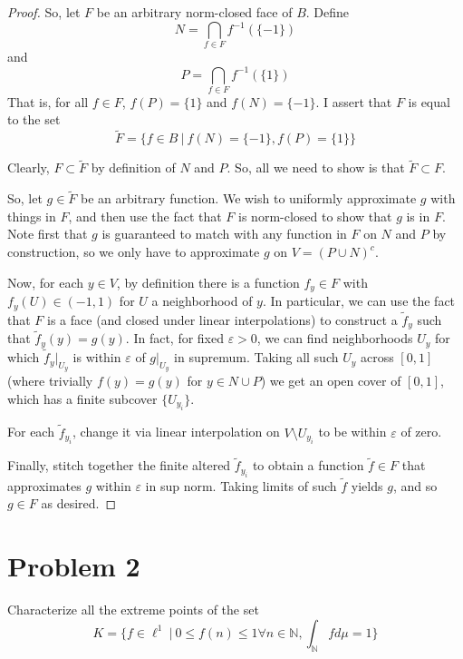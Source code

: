 \documentclass[fontsize=11pt]{scrartcl} %
\numberwithin{equation}{section} %
\numberwithin{figure}{section} %
\numberwithin{table}{section} %
\newcommand{\N}{\mathbb{N}}
\begin{document}
\begin{proof}
    So, let $F$ be an arbitrary norm-closed face of $B$. Define 
    \[
        N = \bigcap_{f\in F}f^{-1}(\{-1\})
    \]
    and
    \[
        P = \bigcap_{f\in F}f^{-1}(\{1\})
    \]
    That is, for all $f\in F$, $f(P) = \{1\}$ and $f(N) = \{-1\}$. I assert that
    $F$ is equal to the set
    \[
        \tilde{F} = \{f\in B\ |\ f(N)=\{-1\}, f(P)=\{1\}\}
    \]

    Clearly, $F\subset \tilde{F}$ by definition of $N$ and $P$. So, all we need
    to show is that $\tilde{F}\subset F$.

    So, let $g\in\tilde{F}$ be an arbitrary function. We wish to uniformly
    approximate $g$ with things in $F$, and then use the fact that $F$ is
    norm-closed to show that $g$ is in $F$. Note first that $g$ is guaranteed to
    match with any function in $F$ on $N$ and $P$ by construction, so we only
    have to approximate $g$ on $V= (P\cup N)^c$.

    Now, for each $y\in V$, by definition there is a function $f_y\in F$ with
    $f_y(U)\in (-1,1)$ for $U$ a neighborhood of $y$. In particular, we can use
    the fact that $F$ is a face (and closed under linear interpolations) to
    construct a $\tilde{f}_y$ such that $\tilde{f}_y(y) = g(y)$. In fact, for
    fixed $\varepsilon>0$, we can find neighborhoods $U_y$ for which
    $\tilde{f}_y|_{U_y}$ is within $\varepsilon$ of $g|_{U_y}$ in supremum.
    Taking all such $U_y$ across $[0,1]$ (where trivially $f(y)=g(y)$ for $y\in
    N\cup P$) we get an open cover of $[0,1]$, which has a finite subcover
    $\{U_{y_i}\}$.

    For each $\tilde{f}_{y_i}$, change it via linear interpolation on
    $V\setminus U_{y_i}$ to be within $\varepsilon$ of zero.

    Finally, stitch together the finite altered $\tilde{f}_{y_i}$ to obtain a
    function $\tilde{f}\in F$ that approximates $g$ within $\varepsilon$ in sup norm.
    Taking limits of such $\tilde{f}$ yields $g$, and so $g\in F$ as desired.

\end{proof}

\newpage

\section*{Problem 2}
Characterize all the extreme points of the set
\[
    K = \{ f\in \ell^1\ |\ 0\leq f(n)\leq 1\forall n\in \N, \int_{\N}fd\mu = 1\}
\]
\end{document}
